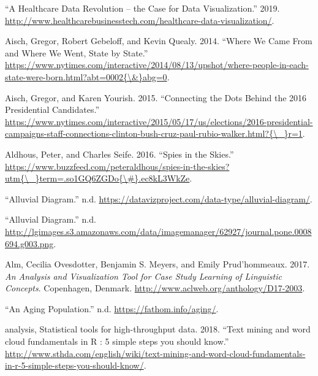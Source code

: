 \documentclass[]{book}
\begin{document}
\leavevmode\hypertarget{ref-healthcare_rev}{}%
``A Healthcare Data Revolution -- the Case for Data Visualization.'' 2019. \url{http://www.healthcarebusinesstech.com/healthcare-data-visualization/}.

\leavevmode\hypertarget{ref-migration}{}%
Aisch, Gregor, Robert Gebeloff, and Kevin Quealy. 2014. ``Where We Came From and Where We Went, State by State.'' \href{https://www.nytimes.com/interactive/2014/08/13/upshot/where-people-in-each-state-were-born.html?abt=0002\%7B/\&\%7Dabg=0}{https://www.nytimes.com/interactive/2014/08/13/upshot/where-people-in-each-state-were-born.html?abt=0002\{\textbackslash{}\&\}abg=0}.

\leavevmode\hypertarget{ref-campaign_staff}{}%
Aisch, Gregor, and Karen Yourish. 2015. ``Connecting the Dots Behind the 2016 Presidential Candidates.'' \href{https://www.nytimes.com/interactive/2015/05/17/us/elections/2016-presidential-campaigns-staff-connections-clinton-bush-cruz-paul-rubio-walker.html?\%7B/_\%7Dr=1}{https://www.nytimes.com/interactive/2015/05/17/us/elections/2016-presidential-campaigns-staff-connections-clinton-bush-cruz-paul-rubio-walker.html?\{\textbackslash{}\_\}r=1}.

\leavevmode\hypertarget{ref-spies_sky}{}%
Aldhous, Peter, and Charles Seife. 2016. ``Spies in the Skies.'' \href{https://www.buzzfeed.com/peteraldhous/spies-in-the-skies?utm\%7B/_\%7Dterm=.so1GQ6ZGDo\%7B/\#\%7D.ec8kL3WkZe}{https://www.buzzfeed.com/peteraldhous/spies-in-the-skies?utm\{\textbackslash{}\_\}term=.so1GQ6ZGDo\{\textbackslash{}\#\}.ec8kL3WkZe}.

\leavevmode\hypertarget{ref-alluvial}{}%
``Alluvial Diagram.'' n.d. \url{https://datavizproject.com/data-type/alluvial-diagram/}.

\leavevmode\hypertarget{ref-alluvial-diag}{}%
``Alluvial Diagram.'' n.d. \url{http://lgimages.s3.amazonaws.com/data/imagemanager/62927/journal.pone.0008694.g003.png}.

\leavevmode\hypertarget{ref-lingui_data}{}%
Alm, Cecilia Ovesdotter, Benjamin S. Meyers, and Emily Prud'hommeaux. 2017. \emph{An Analysis and Visualization Tool for Case Study Learning of Linguistic Concepts}. Copenhagen, Denmark. \url{http://www.aclweb.org/anthology/D17-2003}.

\leavevmode\hypertarget{ref-animated_pyramid}{}%
``An Aging Population.'' n.d. \url{https://fathom.info/aging/}.

\leavevmode\hypertarget{ref-r}{}%
analysis, Statistical tools for high-throughput data. 2018. ``Text mining and word cloud fundamentals in R : 5 simple steps you should know.'' \url{http://www.sthda.com/english/wiki/text-mining-and-word-cloud-fundamentals-in-r-5-simple-steps-you-should-know/}.
\end{document}
